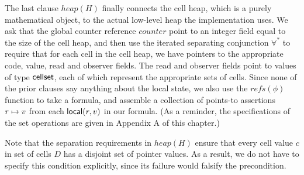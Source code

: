 The last clause $heap(H)$ finally connects the cell heap, which is a
purely mathematical object, to the actual low-level heap the
implementation uses. We ask that the global counter reference
$counter$ point to an integer field equal to the size of the cell
heap, and then use the iterated separating conjunction $\forall^*$ to
require that for each cell in the cell heap, we have pointers to the
appropriate code, value, read and observer fields. The read and
observer fields point to values of type $\mathsf{cellset}$, each of which
represent the appropriate sets of cells.  Since none of the prior
clauses say anything about the local state, we also use the
$\mathit{refs}(\phi)$ function to take a formula, and assemble a
collection of points-to assertions $r \mapsto v$ from each
$\mathsf{local}({r}, {v})$ in our formula. (As a reminder, the specifications
of the set operations are given in Appendix A of this chapter.)

Note that the separation requirements in $\mathit{heap}(H)$ ensure
that every cell value $c$ in set of cells $D$ has a disjoint set of
pointer values. As a result, we do not have to specify this condition
explicitly, since its failure would falsify the precondition.

